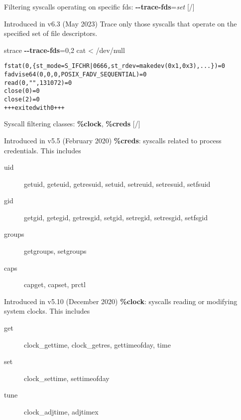 \documentclass[unicode,aspectratio=169,xcolor={table,dvipsnames,usernames}]{beamer}
\begin{document}
\begin{frame}[fragile]{Filtering syscalls operating on specific fds: \textbf{-{}-trace-fds}=\textit{set} \hfill [\insertframenumber/\inserttotalframenumber]}
\large
\begin{block}{Introduced in v6.3 (May 2023)}
Trace only those syscalls that operate on the specified set of file descriptors.
\end{block}
\begin{block}{strace \textbf{-{}-trace-fds}=0,2 cat < /dev/null }
\small
\begin{alltt}
fstat(0, \{st_mode=S_IFCHR|0666, st_rdev=makedev(0x1, 0x3), ...\}) = 0
fadvise64(0, 0, 0, POSIX_FADV_SEQUENTIAL) = 0
read(0, "", 131072)                     = 0
close(0)                                = 0
close(2)                                = 0
+++ exited with 0 +++
\end{alltt}
\end{block}
\end{frame}

\begin{frame}{Syscall filtering classes: \textbf{\%clock}, \textbf{\%creds} \hfill [\insertframenumber/\inserttotalframenumber]}
\begin{block}{Introduced in v5.5 (February 2020)}
\textbf{\%creds}: syscalls related to process credentials.
This includes
\begin{description}
	\item[uid] getuid, geteuid, getresuid, setuid, setreuid, setresuid, setfsuid
	\item[gid] getgid, getegid, getresgid, setgid, setregid, setresgid, setfsgid
	\item[groups] getgroups, setgroups
	\item[caps] capget, capset, prctl
\end{description}
\end{block}

\begin{block}{Introduced in v5.10 (December 2020)}
\textbf{\%clock}: syscalls reading or modifying system clocks.
This includes
\begin{description}
	\item[get] clock\_gettime, clock\_getres, gettimeofday, time
	\item[set] clock\_settime, settimeofday
	\item[tune] clock\_adjtime, adjtimex
\end{description}
\end{block}
\end{frame}
\end{document}
